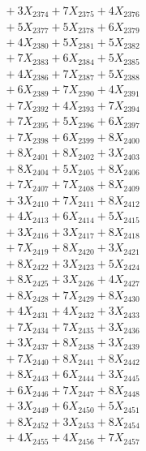 \documentclass[a4paper,10pt]{article}
\begin{document}
{\begin{align}
&\;  + 3 X_{2374} + 7 X_{2375} + 4 X_{2376} \\[0.3ex]
&\;  + 5 X_{2377} + 5 X_{2378} + 6 X_{2379} \\[0.5ex]\allowbreak
&\;  + 4 X_{2380} + 5 X_{2381} + 5 X_{2382} \\[0.3ex]
&\;  + 7 X_{2383} + 6 X_{2384} + 5 X_{2385} \\[0.3ex]
&\;  + 4 X_{2386} + 7 X_{2387} + 5 X_{2388} \\[0.3ex]
&\;  + 6 X_{2389} + 7 X_{2390} + 4 X_{2391} \\[0.3ex]
&\;  + 7 X_{2392} + 4 X_{2393} + 7 X_{2394} \\[0.3ex]
&\;  + 7 X_{2395} + 5 X_{2396} + 6 X_{2397} \\[0.3ex]
&\;  + 7 X_{2398} + 6 X_{2399} + 8 X_{2400} \\[0.3ex]
&\;  + 8 X_{2401} + 8 X_{2402} + 3 X_{2403} \\[0.3ex]
&\;  + 8 X_{2404} + 5 X_{2405} + 8 X_{2406} \\[0.3ex]
&\;  + 7 X_{2407} + 7 X_{2408} + 8 X_{2409} \\[0.5ex]\allowbreak
&\;  + 3 X_{2410} + 7 X_{2411} + 8 X_{2412} \\[0.3ex]
&\;  + 4 X_{2413} + 6 X_{2414} + 5 X_{2415} \\[0.3ex]
&\;  + 3 X_{2416} + 3 X_{2417} + 8 X_{2418} \\[0.3ex]
&\;  + 7 X_{2419} + 8 X_{2420} + 3 X_{2421} \\[0.3ex]
&\;  + 8 X_{2422} + 3 X_{2423} + 5 X_{2424} \\[0.3ex]
&\;  + 8 X_{2425} + 3 X_{2426} + 4 X_{2427} \\[0.3ex]
&\;  + 8 X_{2428} + 7 X_{2429} + 8 X_{2430} \\[0.3ex]
&\;  + 4 X_{2431} + 4 X_{2432} + 3 X_{2433} \\[0.3ex]
&\;  + 7 X_{2434} + 7 X_{2435} + 3 X_{2436} \\[0.3ex]
&\;  + 3 X_{2437} + 8 X_{2438} + 3 X_{2439} \\[0.5ex]\allowbreak
&\;  + 7 X_{2440} + 8 X_{2441} + 8 X_{2442} \\[0.3ex]
&\;  + 8 X_{2443} + 6 X_{2444} + 3 X_{2445} \\[0.3ex]
&\;  + 6 X_{2446} + 7 X_{2447} + 8 X_{2448} \\[0.3ex]
&\;  + 3 X_{2449} + 6 X_{2450} + 5 X_{2451} \\[0.3ex]
&\;  + 8 X_{2452} + 3 X_{2453} + 8 X_{2454} \\[0.3ex]
&\;  + 4 X_{2455} + 4 X_{2456} + 7 X_{2457} \\[0.3ex]

\end{align}}
\end{document}
